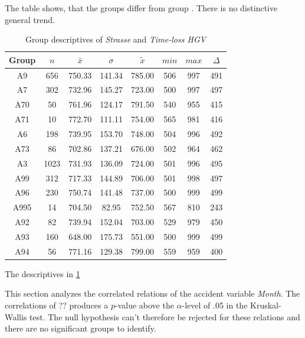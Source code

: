 The table shows, that the groups differ from group . There is no distinctive general trend.
\begin{table}[ht!]
	\tiny
	\centering
	\begin{tabular}{c|c|c|c|c|c|c|c}
		\toprule
		Group & $n$ & $\bar{x}$ & $\sigma$ & $\tilde{x}$ & $min$ & $max$ & $\Delta$ \\
		\midrule
		A9   & 656  & 750.33 & 141.34 & 785.00 & 506 & 997 & 491 \\ 
		A7   & 302  & 732.96 & 145.27 & 723.00 & 500 & 997 & 497 \\ 
		A70  & 50   & 761.96 & 124.17 & 791.50 & 540 & 955 & 415 \\ 
		A71  & 10   & 772.70 & 111.11 & 754.00 & 565 & 981 & 416 \\ 
		A6   & 198  & 739.95 & 153.70 & 748.00 & 504 & 996 & 492 \\ 
		A73  & 86   & 702.86 & 137.21 & 676.00 & 502 & 964 & 462 \\ 
		A3   & 1023 & 731.93 & 136.09 & 724.00 & 501 & 996 & 495 \\ 
		A99  & 312  & 717.33 & 144.89 & 706.00 & 501 & 998 & 497 \\ 
		A96  & 230  & 750.74 & 141.48 & 737.00 & 500 & 999 & 499 \\ 
		A995 & 14   & 704.50 & 82.95  & 752.50 & 567 & 810 & 243 \\ 
		A92  & 82   & 739.94 & 152.04 & 703.00 & 529 & 979 & 450 \\ 
		A93  & 160  & 648.00 & 175.73 & 551.00 & 500 & 999 & 499 \\ 
		A94  & 56   & 771.16 & 129.38 & 799.00 & 559 & 959 & 400 \\ 
		\bottomrule
	\end{tabular}
	\caption{Group descriptives of \textit{Strasse} and \textit{Time-loss HGV}}
	\label{tbl:descriptives_arbis_matched_Strasse_TLHGV}
\end{table}
The descriptives in \cref{tbl:descriptives_arbis_matched_Strasse_TLHGV}

This section analyzes the correlated relations of the accident variable \textit{Month}. The correlations of ?? produces a $p$-value above the $\alpha$-level of .05 in the Kruskal-Wallis test. The null hypothesis can't therefore be rejected for these relations and there are no significant groups to identify.

